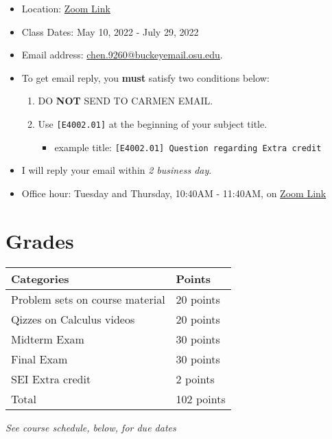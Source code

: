 \documentclass[12pt]{article}
\begin{document}
\begin{itemize}
    \item Location: \href{https://osu.zoom.us/j/95172261996?pwd=bHVuRlU5dHlmSUx5STcycDBkOVdpZz09}{Zoom Link}
    \item Class Dates: May 10, 2022 - July 29, 2022
    \item Email address: \href{chen.9260@buckeyemail.osu.edu}{chen.9260@buckeyemail.osu.edu}.
    \item To get email reply, you \textbf{must} satisfy two conditions below:
    \begin{enumerate}
        \item DO \textbf{NOT} SEND TO CARMEN EMAIL.
        \item Use \texttt{[E4002.01]} at the beginning of your subject title.
        \begin{itemize}
            \item example title: \texttt{[E4002.01] Question regarding Extra credit}
        \end{itemize}
    \end{enumerate}
    \item I will reply your email within \textit{2 business day}.
    \item Office hour: Tuesday and Thursday, 10:40AM - 11:40AM, on \href{https://osu.zoom.us/j/95172261996?pwd=bHVuRlU5dHlmSUx5STcycDBkOVdpZz09}{Zoom Link}
\end{itemize}

\newpage

\section*{Grades}

\newlength\q
\setlength{}
\begin{tabular}{|p{\q}|p{\q}|}
    \hline
    Categories  & Points \\
    \hline
    \hline
    Problem sets on course material   & 20 points \\
    \hline
    Qizzes on Calculus videos & 20 points \\
    \hline
    Midterm Exam & 30 points \\
    \hline
    Final Exam & 30 points \\
    \hline
    SEI Extra credit & 2 points \\
    \hline
    Total & 102 points \\
    \hline
\end{tabular}
\textit{See course schedule, below, for due dates}
\end{document}
